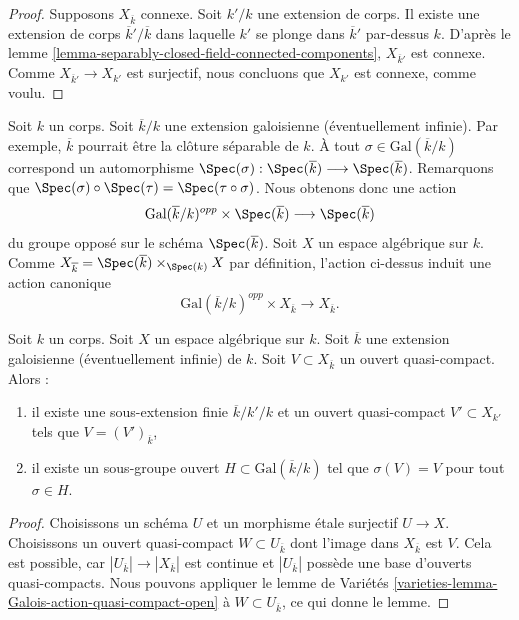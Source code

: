 \begin{proof}
Supposons $X_{\overline{k}}$ connexe. Soit $k'/k$ une extension de
corps. Il existe une extension de corps $\overline{k}'/\overline{k}$
dans laquelle $k'$ se plonge dans $\overline{k}'$ par-dessus $k$.
D'après le lemme \ref{lemma-separably-closed-field-connected-components},
$X_{\overline{k}'}$ est connexe.
Comme $X_{\overline{k}'} \to X_{k'}$ est surjectif, nous concluons
que $X_{k'}$ est connexe, comme voulu.
\end{proof}

\noindent
Soit $k$ un corps. Soit $\overline{k}/k$ une extension galoisienne
(éventuellement infinie). Par exemple, $\overline{k}$ pourrait être la
clôture séparable de $k$.
À tout $\sigma \in \text{Gal}(\overline{k}/k)$ correspond un
automorphisme
$
\Spec(\sigma) :
\Spec(\overline{k})
\longrightarrow
\Spec(\overline{k})
$.
Remarquons que
$\Spec(\sigma) \circ \Spec(\tau) = \Spec(\tau \circ \sigma)$.
Nous obtenons donc une action
$$
\text{Gal}(\overline{k}/k)^{opp} \times \Spec(\overline{k})
\longrightarrow
\Spec(\overline{k})
$$
du groupe opposé sur le schéma $\Spec(\overline{k})$.
Soit $X$ un espace algébrique sur $k$. Comme
$X_{\overline{k}} =
\Spec(\overline{k}) \times_{\Spec(k)} X$
par définition, l'action ci-dessus induit une action canonique
\begin{equation}
\label{equation-galois-action-base-change-kbar}
\text{Gal}(\overline{k}/k)^{opp} \times X_{\overline{k}}
\longrightarrow
X_{\overline{k}}.
\end{equation}

\begin{lemma}
\label{lemma-Galois-action-quasi-compact-open}
Soit $k$ un corps. Soit $X$ un espace algébrique sur $k$.
Soit $\overline{k}$ une extension galoisienne (éventuellement infinie) de $k$.
Soit $V \subset X_{\overline{k}}$ un ouvert quasi-compact.
Alors :
\begin{enumerate}
\item il existe une sous-extension finie $\overline{k}/k'/k$
et un ouvert quasi-compact $V' \subset X_{k'}$ tels que
$V = (V')_{\overline{k}}$,
\item il existe un sous-groupe ouvert $H \subset \text{Gal}(\overline{k}/k)$
tel que $\sigma(V) = V$ pour tout $\sigma \in H$.
\end{enumerate}
\end{lemma}

\begin{proof}
Choisissons un schéma $U$ et un morphisme \'etale surjectif $U \to X$.
Choisissons un ouvert quasi-compact $W \subset U_{\overline{k}}$ dont
l'image dans $X_{\overline{k}}$ est $V$. Cela est possible, car
$|U_{\overline{k}}| \to |X_{\overline{k}}|$ est continue et
$|U_{\overline{k}}|$ possède une base d'ouverts quasi-compacts. Nous pouvons appliquer le
lemme de Variétés
\ref{varieties-lemma-Galois-action-quasi-compact-open}
à $W \subset U_{\overline{k}}$, ce qui donne le lemme.
\end{proof}

